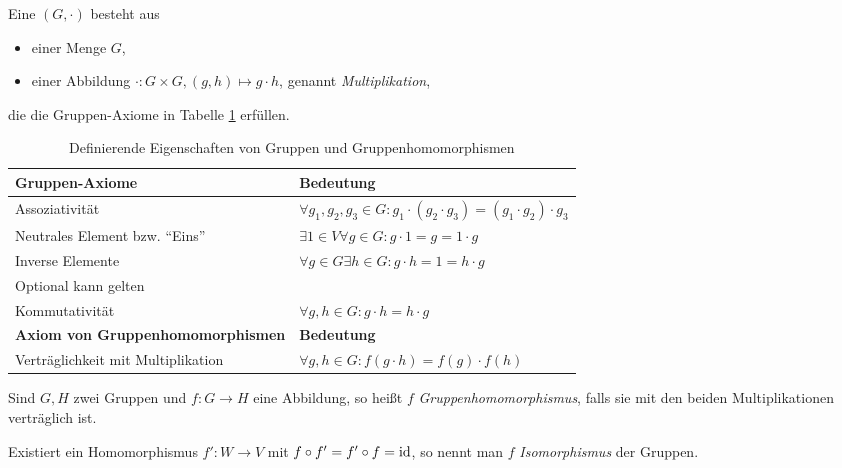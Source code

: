 

\begin{definition}\label{gruppen:def}
Eine  $(G,\cdot)$ besteht aus
\begin{itemize}
	\item einer Menge $G$,
	\item einer Abbildung $\cdot: G\times G, (g,h) \mapsto g\cdot h$, genannt \emph{Multiplikation},
\end{itemize}
die die Gruppen-Axiome in Tabelle \ref{gruppen:def_table} erfüllen.

\begin{table}[!ht]
	\setlength\extrarowheight{10pt} %
	\begin{tabularx}{\textwidth}{p{7cm} X}
		
		\toprule
		\textbf{Gruppen-Axiome}                               & \textbf{Bedeutung} \\
		\midrule
        \hspace{1cm}Assoziativität                           & $\forall g_1,g_2,g_3\in G: g_1\cdot(g_2\cdot g_3) = (g_1\cdot g_2)\cdot g_3$ \\
		\hspace{1cm}Neutrales Element bzw. \enquote{Eins}    & $\exists 1\in V\forall g\in G: g\cdot 1 = g = 1\cdot g$  \\
		\hspace{1cm}Inverse Elemente                         & $\forall g \in G\exists h \in G: g\cdot h = 1 = h\cdot g$ \\
		Optional kann gelten & \\
        \hspace{1cm}Kommutativität                           & $\forall g,h\in G: g\cdot h=h\cdot g$ \\
        \textbf{Axiom von Gruppenhomomorphismen}             & \textbf{Bedeutung} \\
        \midrule
        Verträglichkeit mit Multiplikation & $\forall g,h\in G: f(g\cdot h) = f(g)\cdot f(h)$ \\
        \bottomrule
	\end{tabularx}
	\caption{Definierende Eigenschaften von Gruppen und Gruppenhomomorphismen}
    \label{gruppen:def_table}
\end{table}

Sind $G,H$ zwei Gruppen und $f: G\to H$ eine Abbildung, so heißt $f$ \emph{Gruppenhomomorphismus}, falls sie mit den beiden Multiplikationen verträglich ist.

Existiert ein Homomorphismus $f': W\to V$ mit $f\circ f'=f'\circ f=\operatorname{id}$, so nennt man $f$ \emph{Isomorphismus} der Gruppen.
\end{definition}
